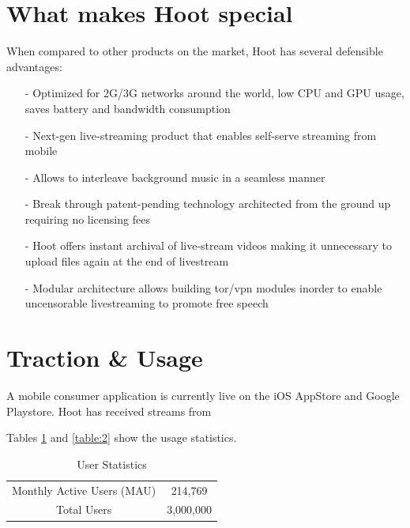 \documentclass{article}
\begin{document}
\section{What makes Hoot special}
When compared to other products on the market, Hoot has several defensible advantages:
\begin{itemize}
\item[-]Optimized for 2G/3G networks around the world, low CPU and GPU usage, saves battery and bandwidth consumption
\item[-]Next-gen live-streaming product that enables self-serve streaming from mobile
\item[-]Allows to interleave background music in a seamless manner
\item[-]Break through patent-pending technology architected from the
  ground up requiring no licensing fees
\item[-]Hoot offers instant archival of live-stream videos making it unnecessary to upload files again at the end of livestream
\item[-]Modular architecture allows building tor/vpn modules inorder
  to enable uncensorable livestreaming to promote free speech
\end{itemize}


\section{Traction \& Usage}
A mobile consumer application is currently live on the iOS AppStore and Google Playstore. Hoot has received streams from 


Tables \ref{table:1} and \ref{table:2} show the usage statistics.

\setlength{\arrayrulewidth}{.7mm}
\setlength{\tabcolsep}{18pt}
\renewcommand{\arraystretch}{2.0} 
 


\begin{table}[!htb]
\centering
\begin{tabular}{ |c|c| }
\hline
\rowcolor{lightgray} \multicolumn{2}{|c|}{User Statistics} \\
\hline
Monthly Active Users (MAU) & 214,769 \\
Total Users & 3,000,000  \\
\hline
\end{tabular}
\caption{User Statistics}
\label{table:1}
\end{table}
\end{document}
